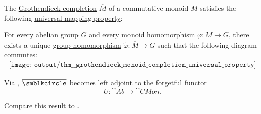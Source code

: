 \begin{theorem}\label{thm:grothendieck_monoid_completion_universal_property}
  The \hyperref[def:monoid_grothendieck_completion]{Grothendieck completion} \( \overline{M} \) of a commutative monoid \( M \) satisfies the following \hyperref[rem:universal_mapping_property]{universal mapping property}:
  \begin{displayquote}
    For every abelian group \( G \) and every monoid homomorphism \( \varphi: M \to G \), there exists a unique \hyperref[def:group/homomorphism]{group homomorphism} \( \widetilde{\varphi}: \overline{M} \to G \) such that the following diagram commutes:
    \begin{equation}\label{eq:thm:grothendieck_monoid_completion_universal_property/diagram}
      \begin{aligned}
        \texttt{[image: output/thm\_\_grothendieck\_monoid\_completion\_universal\_property]}
      \end{aligned}
    \end{equation}
  \end{displayquote}

\end{theorem}
\begin{comments}
  \item Via , \( \overline{\anon} \) becomes \hyperref[def:category_adjunction]{left adjoint} to the \hyperref[def:concrete_category]{forgetful functor}
  \begin{equation*}
    U: \cat{Ab} \to \cat{CMon}.
  \end{equation*}

  \item Compare this result to .
\end{comments}
